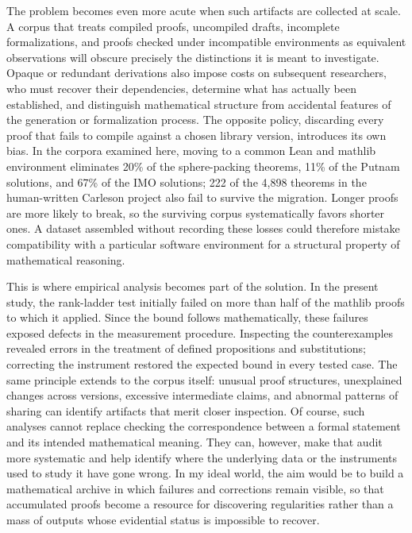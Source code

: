 \documentclass{article}
\begin{document}
The problem becomes even more acute when such artifacts are collected at scale. A corpus that treats compiled proofs, 
uncompiled drafts, incomplete formalizations, and proofs checked under incompatible environments as equivalent 
observations will obscure precisely the distinctions it is meant to investigate. Opaque or redundant derivations 
also impose costs on subsequent researchers, who must recover their dependencies, determine what has actually been 
established, and distinguish mathematical structure from accidental features of the generation or formalization process. 
The opposite policy, discarding every proof that fails to compile against a chosen library version, introduces its own
bias. In the corpora examined here, moving to a common Lean and mathlib environment eliminates 20\% of the 
sphere-packing theorems, 11\% of the Putnam solutions, and 67\% of the IMO solutions; 222 of the 4,898 theorems in the 
human-written Carleson project also fail to survive the migration. Longer proofs are more likely to break, so the 
surviving corpus systematically favors shorter ones. A dataset assembled without recording these losses could 
therefore mistake compatibility with a particular software environment for a structural property of mathematical reasoning.

This is where empirical analysis becomes part of the solution. In the present study, the rank-ladder test initially 
failed on more than half of the mathlib proofs to which it applied. Since the bound follows mathematically, these 
failures exposed defects in the measurement procedure. Inspecting the counterexamples revealed errors in the 
treatment of defined propositions and substitutions; correcting the instrument restored the expected bound in every 
tested case. The same principle extends to the corpus itself: unusual proof structures, unexplained changes across 
versions, excessive intermediate claims, and abnormal patterns of sharing can identify artifacts that merit closer 
inspection. Of course, such analyses cannot replace checking the correspondence between a formal statement and its intended 
mathematical meaning. They can, however, make that audit more systematic and help identify where the underlying data or the 
instruments used to study it have gone wrong. In my ideal world, the aim would be to build a mathematical archive in which 
failures and corrections remain visible, so that accumulated proofs become a resource for discovering regularities rather 
than a mass of outputs whose evidential status is impossible to recover.
\end{document}
